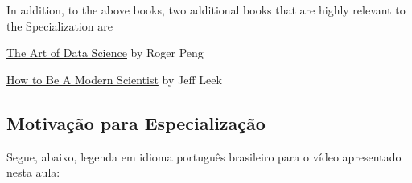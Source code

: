 In addition, to the above books, two additional books that are highly relevant to the Specialization are
\begin{nitemize}
\item    \href{https://leanpub.com/artofdatascience?utm_source=DST2&utm_medium=Reading&utm_campaign=DST2}{The Art of Data Science} by Roger Peng
\item    \href{https://leanpub.com/modernscientist}{How to Be A Modern Scientist} by Jeff Leek
\end{nitemize}


\subsection{Motivação para Especialização}

Segue, abaixo, legenda em idioma português brasileiro para o vídeo apresentado nesta aula:

